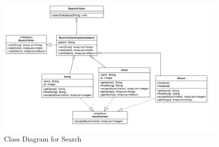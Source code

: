 \documentclass[12pt]{article}
\begin{document}
	\begin{figure}[H]
		\centering
		\includegraphics[scale=0.25]{Search.png}
		\caption{Class Diagram for Search}
		\label{fig:classDiagSearch}
	\end{figure}
\end{document}
